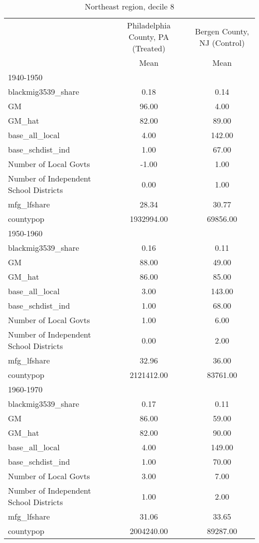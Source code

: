 \begin{table}[htbp]\centering
\def\sym#1{\ifmmode^{#1}\else\(^{#1}\)\fi}
\caption{Northeast region, decile 8 \label{tab1}}
\begin{tabular}{l*{2}{c}}
\toprule
                    &\multicolumn{1}{c}{Philadelphia County, PA (Treated)}&\multicolumn{1}{c}{Bergen County, NJ (Control)}\\
                    &        Mean&        Mean\\
\midrule
1940-1950           &            &            \\
blackmig3539\_share  &        0.18&        0.14\\
GM                  &       96.00&        4.00\\
GM\_hat              &       82.00&       89.00\\
base\_all\_local      &        4.00&      142.00\\
base\_schdist\_ind    &        1.00&       67.00\\
Number of Local Govts&       -1.00&        1.00\\
Number of Independent School Districts&        0.00&        1.00\\
mfg\_lfshare         &       28.34&       30.77\\
countypop           &  1932994.00&    69856.00\\
\midrule
1950-1960           &            &            \\
blackmig3539\_share  &        0.16&        0.11\\
GM                  &       88.00&       49.00\\
GM\_hat              &       86.00&       85.00\\
base\_all\_local      &        3.00&      143.00\\
base\_schdist\_ind    &        1.00&       68.00\\
Number of Local Govts&        1.00&        6.00\\
Number of Independent School Districts&        0.00&        2.00\\
mfg\_lfshare         &       32.96&       36.00\\
countypop           &  2121412.00&    83761.00\\
\midrule
1960-1970           &            &            \\
blackmig3539\_share  &        0.17&        0.11\\
GM                  &       86.00&       59.00\\
GM\_hat              &       82.00&       90.00\\
base\_all\_local      &        4.00&      149.00\\
base\_schdist\_ind    &        1.00&       70.00\\
Number of Local Govts&        3.00&        7.00\\
Number of Independent School Districts&        1.00&        2.00\\
mfg\_lfshare         &       31.06&       33.65\\
countypop           &  2004240.00&    89287.00\\
\bottomrule
\end{tabular}
\end{table}
